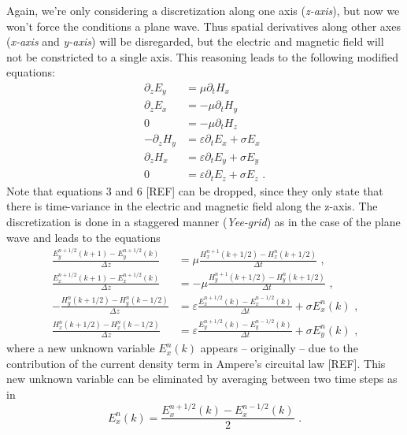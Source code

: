 \documentclass[]{report}
\begin{document}
Again, we're only considering a discretization along one axis (\textit{z-axis}), but now we won't force the conditions a plane wave. Thus spatial derivatives along other axes (\textit{x-axis} and \textit{y-axis}) will be disregarded, but the electric and magnetic field will not be constricted to a single axis. This reasoning leads to the following modified equations:
\begin{align}
	\partial_z E_y &= \mu \partial_t H_x \\
	\partial_z E_x &= -\mu \partial_t H_y \\
	0 &= -\mu \partial_t H_z \\
	- \partial_z H_y &= \varepsilon \partial_t E_x + \sigma E_x \\
	\partial_z H_x  &= \varepsilon \partial_t E_y + \sigma E_y \\
	0 &= \varepsilon \partial_t E_z + \sigma E_z \text{ .}
\end{align}
Note that equations 3 and 6 [REF] can be dropped, since they only state that there is time-variance in the electric and magnetic field along the z-axis. The discretization is done in a staggered manner (\textit{Yee-grid}) as in the case of the plane wave and leads to the equations
\begin{align}
	\frac{E_y^{n+1/2}(k+1)-E_y^{n+1/2}(k)}{\Delta z} &= \mu \frac{H_x^{n+1}(k+1/2)-H_x^{n}(k+1/2)}{\Delta t} \text{ ,} \\
	\frac{E_x^{n+1/2}(k+1)-E_x^{n+1/2}(k)}{\Delta z} &= -\mu \frac{H_y^{n+1}(k+1/2)-H_y^{n}(k+1/2)}{\Delta t} \text{ ,} \\
	-\frac{H_y^{n}(k+1/2)-H_y^{n}(k-1/2)}{\Delta z} &= \varepsilon \frac{E_x^{n+1/2}(k)-E_x^{n-1/2}(k)}{\Delta t} + \sigma E_x^n(k) \text{ ,} \\
	\frac{H_x^{n}(k+1/2)-H_x^{n}(k-1/2)}{\Delta z} &= \varepsilon \frac{E_y^{n+1/2}(k)-E_y^{n-1/2}(k)}{\Delta t} + \sigma E_y^n(k) \text{ ,}
\end{align}
where a new unknown variable \( E_x^n(k) \) appears -- originally -- due to the contribution of the current density term in Ampere's circuital law [REF]. This new unknown variable can be eliminated by averaging between two time steps as in 
\begin{equation}
	E_x^n(k) = \frac{E_x^{n+1/2}(k)-E_x^{n-1/2}(k)}{2} \text{ .}
\end{equation}
\end{document}
